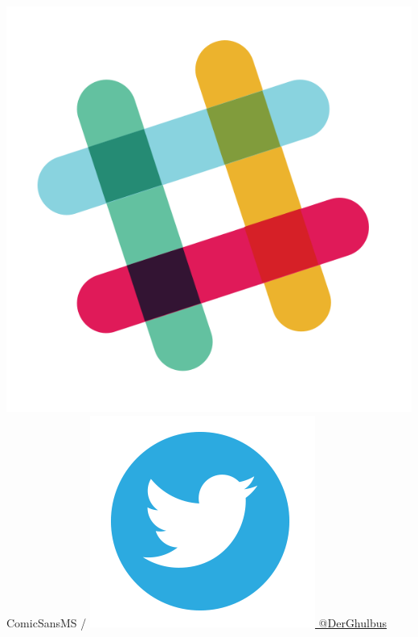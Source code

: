 \documentclass[aspectratio=169]{beamer}
\begin{document}
\begin{frame}
  \includegraphics[height=.05\textheight]{resources/slack-icon.png} ComicSansMS /
  \href{https://twitter.com/DerGhulbus/}{\includegraphics[height=.05\textheight]{resources/twitter-icon.png} @DerGhulbus}

\end{frame}
\end{document}
